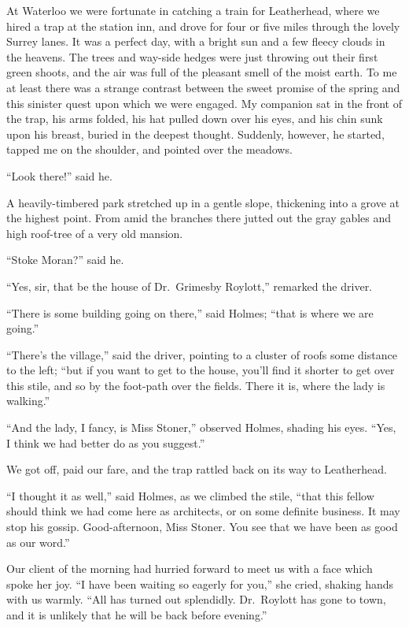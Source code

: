 At Waterloo we were fortunate in catching a train for
Leatherhead, where we hired a trap at the station inn, and
drove for four or five miles through the lovely Surrey lanes.
It was a perfect day, with a bright sun and a few fleecy clouds
in the heavens. The trees and way-side hedges were just
throwing out their first green shoots, and the air was full of
the pleasant smell of the moist earth. To me at least there
was a strange contrast between the sweet promise of the
spring and this sinister quest upon which we were engaged.
My companion sat in the front of the trap, his arms folded,
his hat pulled down over his eyes, and his chin sunk upon his
breast, buried in the deepest thought. Suddenly, however,
he started, tapped me on the shoulder, and pointed over the
meadows.

“Look there!” said he.

A heavily-timbered park stretched up in a gentle slope,
thickening into a grove at the highest point. From amid the
branches there jutted out the gray gables and high roof-tree
of a very old mansion.

“Stoke Moran?” said he.

“Yes, sir, that be the house of Dr.\ Grimesby Roylott,” remarked
the driver.

“There is some building going on there,” said Holmes;
“that is where we are going.”

“There’s the village,” said the driver, pointing to a cluster
of roofs some distance to the left; “but if you want to get
to the house, you’ll find it shorter to get over this stile, and so
by the foot-path over the fields. There it is, where the lady
is walking.”

“And the lady, I fancy, is Miss Stoner,” observed Holmes,
shading his eyes. “Yes, I think we had better do as you
suggest.”

We got off, paid our fare, and the trap rattled back on its
way to Leatherhead.

“I thought it as well,” said Holmes, as we climbed the
stile, “that this fellow should think we had come here as
architects, or on some definite business. It may stop his
gossip. Good-afternoon, Miss Stoner. You see that we have
been as good as our word.”

Our client of the morning had hurried forward to meet us
with a face which spoke her joy. “I have been waiting so
eagerly for you,” she cried, shaking hands with us warmly.
“All has turned out splendidly. Dr.\ Roylott has gone to
town, and it is unlikely that he will be back before evening.”

